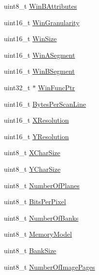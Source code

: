 \begin{DoxyCompactItemize}
\item 
uint8\+\_\+t \mbox{\hyperlink{structRTEMS__PACKED_ad96368c32b97c9f8cbc6fc60d5c42099}{Win\+B\+Attributes}}
\item 
uint16\+\_\+t \mbox{\hyperlink{structRTEMS__PACKED_ae4f10eb61f43381d188e2c7a6596c9a1}{Win\+Granularity}}
\item 
uint16\+\_\+t \mbox{\hyperlink{structRTEMS__PACKED_aea89252c6c608981a1585f986f6c2a35}{Win\+Size}}
\item 
uint16\+\_\+t \mbox{\hyperlink{structRTEMS__PACKED_a6bdc92254c6571aadb776158c638d688}{Win\+A\+Segment}}
\item 
uint16\+\_\+t \mbox{\hyperlink{structRTEMS__PACKED_a273a43b8843f72a6f241516d57c14c38}{Win\+B\+Segment}}
\item 
uint32\+\_\+t $\ast$ \mbox{\hyperlink{structRTEMS__PACKED_a16177825cd25298dd2de68ad90f93ed0}{Win\+Func\+Ptr}}
\item 
uint16\+\_\+t \mbox{\hyperlink{structRTEMS__PACKED_a80143d995604fb47176f2cb6642cd7bf}{Bytes\+Per\+Scan\+Line}}
\item 
uint16\+\_\+t \mbox{\hyperlink{structRTEMS__PACKED_ae4edd3dd4ad24b63da0d123334437579}{X\+Resolution}}
\item 
uint16\+\_\+t \mbox{\hyperlink{structRTEMS__PACKED_acc3f286332216205902ac984e5d8e01f}{Y\+Resolution}}
\item 
uint8\+\_\+t \mbox{\hyperlink{structRTEMS__PACKED_a424d75b476420d8c7d78eb690a12978e}{X\+Char\+Size}}
\item 
uint8\+\_\+t \mbox{\hyperlink{structRTEMS__PACKED_abb86ebed1684e5ce3c8af903041e5acc}{Y\+Char\+Size}}
\item 
uint8\+\_\+t \mbox{\hyperlink{structRTEMS__PACKED_a9e00d6ecd3365ce07cd52f0ac36f3828}{Number\+Of\+Planes}}
\item 
uint8\+\_\+t \mbox{\hyperlink{structRTEMS__PACKED_a9d577eb610d061f4775b6fed56753bf8}{Bits\+Per\+Pixel}}
\item 
uint8\+\_\+t \mbox{\hyperlink{structRTEMS__PACKED_a9277689de08b09a24833156c6aaed4d7}{Number\+Of\+Banks}}
\item 
uint8\+\_\+t \mbox{\hyperlink{structRTEMS__PACKED_a2bb164573d61d3075480ea5108b3d527}{Memory\+Model}}
\item 
uint8\+\_\+t \mbox{\hyperlink{structRTEMS__PACKED_a513323eda4926db4b629b15d936eda17}{Bank\+Size}}
\item 
uint8\+\_\+t \mbox{\hyperlink{structRTEMS__PACKED_abec28a8de0ce2a4ae05885085ed874a9}{Number\+Of\+Image\+Pages}}
\item 

\end{DoxyCompactItemize}

